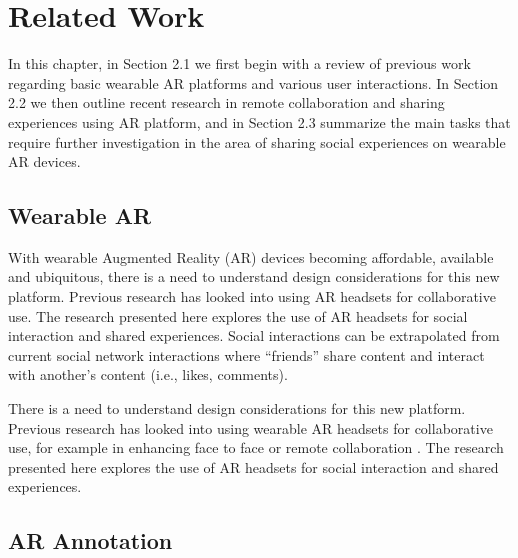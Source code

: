 \chapter{Related Work} %

\label{ch:background} %

In this chapter, in Section 2.1 we first begin with a review of previous work regarding basic wearable AR platforms and various user interactions. In Section 2.2 we then outline recent research in remote collaboration and sharing experiences using AR platform, and in Section 2.3 summarize the main tasks that require further investigation in the area of sharing social experiences on wearable AR devices.

\section{Wearable AR}

With wearable Augmented Reality (AR) devices becoming affordable, available and ubiquitous, there is a need to understand design considerations for this new platform. Previous research has looked into using AR headsets for collaborative use. The research presented here explores the use of AR headsets for social interaction and shared experiences. Social interactions can be extrapolated from current social network interactions where \enquote{friends} share content and interact with another's content (i.e., likes, comments).

There is a need to understand design considerations for this new platform. Previous research has looked into using wearable AR headsets for collaborative use, for example in enhancing face to face \cite{Billinghurst2002} or remote collaboration \cite{gupta2016you}. The research presented here explores the use of AR headsets for social interaction and shared experiences. 

\section{AR Annotation}

